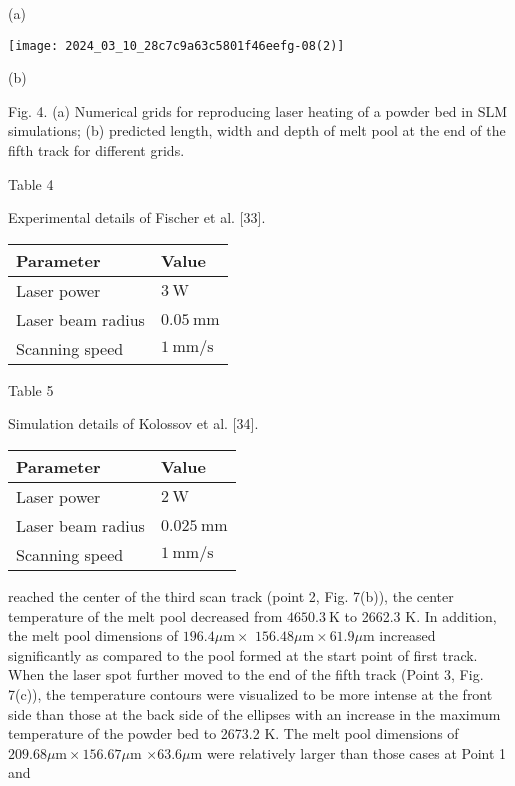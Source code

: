 \documentclass[10pt]{article}
\begin{document}
(a)

\begin{center}
\texttt{[image: 2024\_03\_10\_28c7c9a63c5801f46eefg-08(2)]}
\end{center}

(b)

Fig. 4. (a) Numerical grids for reproducing laser heating of a powder bed in SLM simulations; (b) predicted length, width and depth of melt pool at the end of the fifth track for different grids.

Table 4

Experimental details of Fischer et al. [33].

\begin{center}
\begin{tabular}{ll}
\hline
Parameter & Value \\
\hline
Laser power & $3 \mathrm{~W}$ \\
Laser beam radius & $0.05 \mathrm{~mm}$ \\
Scanning speed & $1 \mathrm{~mm} / \mathrm{s}$ \\
\hline
\end{tabular}
\end{center}

Table 5

Simulation details of Kolossov et al. [34].

\begin{center}
\begin{tabular}{ll}
\hline
Parameter & Value \\
\hline
Laser power & $2 \mathrm{~W}$ \\
Laser beam radius & $0.025 \mathrm{~mm}$ \\
Scanning speed & $1 \mathrm{~mm} / \mathrm{s}$ \\
\hline
\end{tabular}
\end{center}

reached the center of the third scan track (point 2, Fig. 7(b)), the center temperature of the melt pool decreased from $4650.3 \mathrm{~K}$ to 2662.3 K. In addition, the melt pool dimensions of $196.4 \mu \mathrm{m} \times$ $156.48 \mu \mathrm{m} \times 61.9 \mu \mathrm{m}$ increased significantly as compared to the pool formed at the start point of first track. When the laser spot further moved to the end of the fifth track (Point 3, Fig. 7(c)), the temperature contours were visualized to be more intense at the front side than those at the back side of the ellipses with an increase in the maximum temperature of the powder bed to 2673.2 K. The melt pool dimensions of $209.68 \mu \mathrm{m} \times 156.67 \mu \mathrm{m}$ $\times 63.6 \mu \mathrm{m}$ were relatively larger than those cases at Point 1 and
\end{document}
